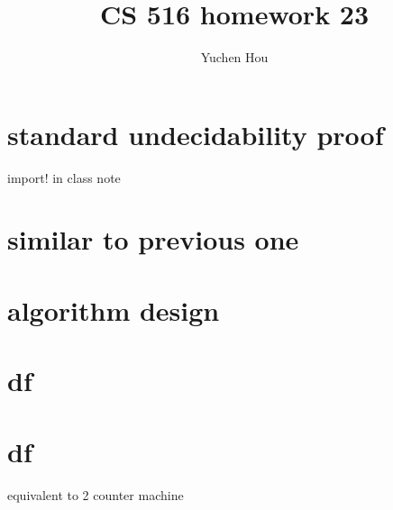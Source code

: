 \documentclass{article}
\begin{document}
\lstset{language=python, tabsize=4}
\title{CS 516 homework 23}
\author{Yuchen Hou}
\maketitle

\section{standard undecidability proof}
import! in class note

\section{similar to previous one}

\section{algorithm design}

\section{df}

\section{df}

equivalent to 2 counter machine
\end{document}
